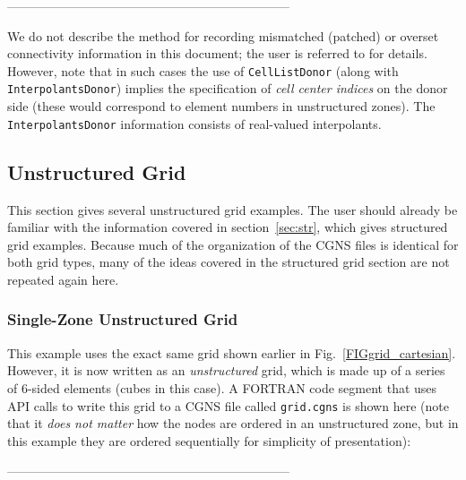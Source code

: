 \documentclass[12pt]{article}
\begin{document}
--------------------------------------------------------------------

\noindent
We do not describe the method for recording mismatched (patched) or
overset connectivity information in this document;
the user is referred to \cite{ALLMARAS} for details.  However, note that
in such cases the use of {\tt CellListDonor} (along with {\tt InterpolantsDonor})
implies the specification of {\it cell center indices} on the donor
side (these would correspond to element numbers in
unstructured zones).  The {\tt InterpolantsDonor} information consists of
real-valued interpolants.

\newpage
\subsection{Unstructured Grid} \label{sec:unstr}

This section gives several unstructured grid examples.
The user should already be familiar with the information
covered in section~\ref{sec:str}, which gives structured grid examples.
Because much of the organization of the
CGNS files is identical for both grid types, many
of the ideas covered in the structured grid section
are not repeated again here.

\subsubsection{Single-Zone Unstructured Grid} \label{sec:unstrgrid}

This example uses the exact same grid shown
earlier in Fig.~\ref{FIGgrid_cartesian}.  However, it is now written
as an {\it unstructured} grid, which is made up of a series
of 6-sided elements (cubes in this case).
A FORTRAN code segment that uses API calls to write this grid
to a CGNS file called {\tt grid.cgns} is shown here (note that it {\it does not matter}
how the nodes are ordered in an unstructured zone, but in this 
example they are ordered sequentially for simplicity of presentation):

--------------------------------------------------------------------
\end{document}
